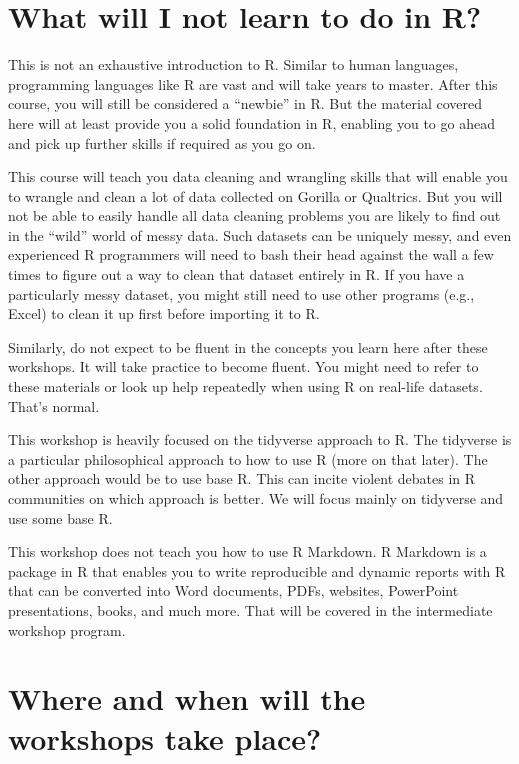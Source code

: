 \documentclass[
]{book}
\begin{document}
\hypertarget{what-will-i-not-learn-to-do-in-r}{%
\section{What will I not learn to do in R?}\label{what-will-i-not-learn-to-do-in-r}}

This is not an exhaustive introduction to R. Similar to human languages, programming languages like R are vast and will take years to master. After this course, you will still be considered a ``newbie'' in R. But the material covered here will at least provide you a solid foundation in R, enabling you to go ahead and pick up further skills if required as you go on.

This course will teach you data cleaning and wrangling skills that will enable you to wrangle and clean a lot of data collected on Gorilla or Qualtrics. But you will not be able to easily handle all data cleaning problems you are likely to find out in the ``wild'' world of messy data. Such datasets can be uniquely messy, and even experienced R programmers will need to bash their head against the wall a few times to figure out a way to clean that dataset entirely in R. If you have a particularly messy dataset, you might still need to use other programs (e.g., Excel) to clean it up first before importing it to R.

Similarly, do not expect to be fluent in the concepts you learn here after these workshops. It will take practice to become fluent. You might need to refer to these materials or look up help repeatedly when using R on real-life datasets. That's normal.

This workshop is heavily focused on the tidyverse approach to R. The tidyverse is a particular philosophical approach to how to use R (more on that later). The other approach would be to use base R. This can incite violent debates in R communities on which approach is better. We will focus mainly on tidyverse and use some base R.

This workshop does not teach you how to use R Markdown. R Markdown is a package in R that enables you to write reproducible and dynamic reports with R that can be converted into Word documents, PDFs, websites, PowerPoint presentations, books, and much more. That will be covered in the intermediate workshop program.

\hypertarget{where-and-when-will-the-workshops-take-place}{%
\section{Where and when will the workshops take place?}\label{where-and-when-will-the-workshops-take-place}}
\end{document}
